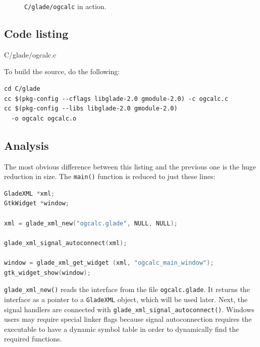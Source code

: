 \documentclass[a4paper,oneside]{article}
\newcommand{\filename}[1]{\texttt{#1}}
\newcommand{\program}[1]{\texttt{#1}}
\newcommand{\class}[1]{\texttt{#1}}
\newcommand{\function}[1]{\texttt{#1()}}
\begin{document}
\begin{figure}
  \centering
  \caption[\program{C/glade/ogcalc} in action]{\program{C/glade/ogcalc} in
    action.}
  \label{fig:ogcalcgl}
\end{figure}

\subsection{Code listing}


                 {C/glade/ogcalc.c}

To build the source, do the following:

\begin{verbatim}
cd C/glade
cc $(pkg-config --cflags libglade-2.0 gmodule-2.0) -c ogcalc.c
cc $(pkg-config --libs libglade-2.0 gmodule-2.0)
  -o ogcalc ogcalc.o
\end{verbatim}

\subsection{Analysis}

The most obvious difference between this listing and the previous one
is the huge reduction in size.  The \function{main} function is
reduced to just these lines:

\begin{lstlisting}[numbers=none, language=C]
GladeXML *xml;
GtkWidget *window;

xml = glade_xml_new("ogcalc.glade", NULL, NULL);

glade_xml_signal_autoconnect(xml);

window = glade_xml_get_widget (xml, "ogcalc_main_window");
gtk_widget_show(window);
\end{lstlisting}

\function{glade\_xml\_new} reads the interface from the file
\filename{ogcalc.glade}.  It returns the interface as a pointer to a
\class{GladeXML} object, which will be used later.  Next, the signal
handlers are connected with
\function{glade\_xml\_signal\_autoconnect}.  Windows users may require
special linker flags because signal autoconnection requires the
executable to have a dynamic symbol table in order to dynamically find
the required functions.
\end{document}
